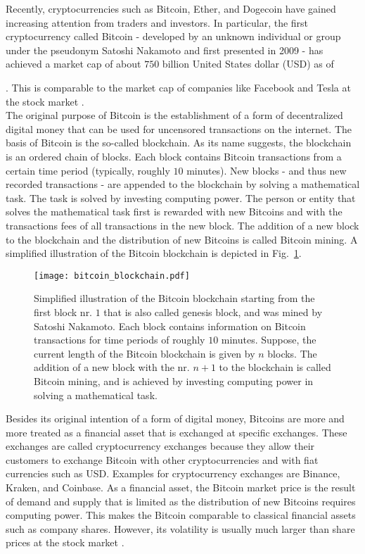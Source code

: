 Recently, cryptocurrencies such as Bitcoin, Ether, and Dogecoin have gained increasing attention from traders and investors. In particular, the first cryptocurrency called Bitcoin - developed by an unknown individual or group under the pseudonym Satoshi Nakamoto and first presented in 2009 \cite{Bitcoin2009} - has achieved a market cap of about $750$ billion United States dollar (USD) as of \date{14 June 2021}. This is comparable to the market cap of companies like Facebook and Tesla at the stock market \cite{MarketCapCompany2021}\cite{MarketCapBitcoin2021}.\\

The original purpose of Bitcoin is the establishment of a form of decentralized digital money that can be used for uncensored transactions on the internet. The basis of Bitcoin is the so-called blockchain. As its name suggests, the blockchain is an ordered chain of blocks. Each block contains Bitcoin transactions from a certain time period (typically, roughly $10$ minutes). New blocks - and thus new recorded transactions - are appended to the blockchain by solving a mathematical task. The task is solved by investing computing power. The person or entity that solves the mathematical task first is rewarded with new Bitcoins and with the transactions fees of all transactions in the new block. The addition of a new block to the blockchain and the distribution of new Bitcoins is called Bitcoin mining. A simplified illustration of the Bitcoin blockchain is depicted in Fig.~\ref{fig:blockchain}.

\begin{figure}[h!]
  \centering
  \texttt{[image: bitcoin\_blockchain.pdf]}
  \caption{Simplified illustration of the Bitcoin blockchain starting from the first block nr. $1$ that is also called genesis block, and was mined by Satoshi Nakamoto. Each block contains information on Bitcoin transactions for time periods of roughly $10$ minutes. Suppose, the current length of the Bitcoin blockchain is given by $n$ blocks. The addition of a new block with the nr. $n+1$ to the blockchain is called Bitcoin mining, and is achieved by investing computing power in solving a mathematical task.}
  \label{fig:blockchain}
\end{figure}

Besides its original intention of a form of digital money, Bitcoins are more and more treated as a financial asset that is exchanged at specific exchanges. These exchanges are called cryptocurrency exchanges because they allow their customers to exchange Bitcoin with other cryptocurrencies and with fiat currencies such as USD. Examples for cryptocurrency exchanges are Binance, Kraken, and Coinbase. As a financial asset, the Bitcoin market price is the result of demand and supply that is limited as the distribution of new Bitcoins requires computing power. This makes the Bitcoin comparable to classical financial assets such as company shares. However, its volatility is usually much larger than share prices at the stock market \cite{bitcoin_book_2018}. \\

